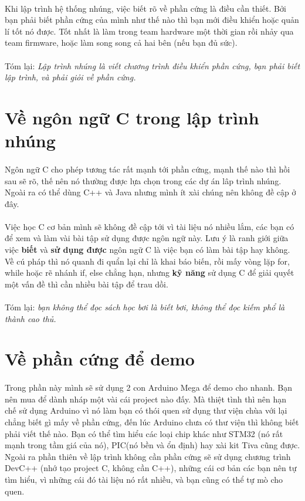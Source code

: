 \documentclass[12pt,a5paper]{book}
\begin{document}
		\paragraph{}
Khi lập trình hệ thống nhúng, việc biết rõ về phần cứng là điều cần thiết. Bởi bạn phải biết phần cứng của mình như thế nào thì bạn mới điều khiển hoặc quản lí tốt nó được. Tốt nhất là làm trong team hardware một thời gian rồi nhảy qua team firmware, hoặc làm song song cả hai bên (nếu bạn đủ sức).
		\paragraph{}
Tóm lại: \textit{Lập trình nhúng là viết chương trình điều khiển phần cứng, bạn phải biết lập trình, và phải giỏi về phần cứng.} 
	\section{Về ngôn ngữ C trong lập trình nhúng}
		\paragraph{}
	Ngôn ngữ C cho phép tương tác rất mạnh tới phần cứng, mạnh thế nào thì hồi sau sẽ rõ, thế nên nó thường được lựa chọn trong các dự án lâp trình nhúng. Ngoài ra có thể dùng C++ và Java nhưng mình ít xài chúng nên không đề cập ở đây.
		\paragraph{}
	Việc học C cơ bản mình sẽ không đề cập tới vì tài liệu nó nhiều lắm, các bạn có để xem và làm vài bài tập sử dụng được ngôn ngữ này. Lưu ý là ranh giới giữa việc \textbf{biết} và \textbf{sử dụng được} ngôn ngữ C là việc bạn có làm bài tập hay không. Về cú pháp thì nó quanh đi quẩn lại chỉ là khai báo biến, rồi mấy vòng lặp for, while hoặc rẽ nhánh if, else chẳng hạn, nhưng \textbf{kỹ năng} sử dụng C để giải quyết một vấn đề thì cần nhiều bài tập để trau dồi.
		\paragraph{}
	Tóm lại: \textit{bạn không thể đọc sách học bơi là biết bơi, không thể đọc kiếm phổ là thành cao thủ.}
	\section{Về phần cứng để demo}
	\paragraph{}
	Trong phần này mình sẽ sử dụng 2 con Arduino Mega để demo cho nhanh. Bạn nên mua để dành nháp một vài cái project nào đấy. Mà thiệt tình thì nên hạn chế sử dụng Arduino vì nó làm bạn có thói quen sử dụng thư viện chùa với lại chẳng biết gì mấy về phần cứng, đến lúc Arduino chưa có thư viện thì không biết phải viết thế nào. Bạn có thể tìm hiểu các loại chip khác như STM32 (nó rất mạnh trong tầm giá của nó), PIC(nó bền và ổn định) hay xài kit Tiva cũng được. Ngoài ra phần thiên về lập trình không cần phần cứng sẽ sử dụng chương trình DevC++ (nhớ tạo project C, không cần C++), những cái cơ bản các bạn nên tự tìm hiểu, vì những cái đó tài liệu nó rất nhiều, và bạn cũng có thể tự mò cho quen.
\end{document}
